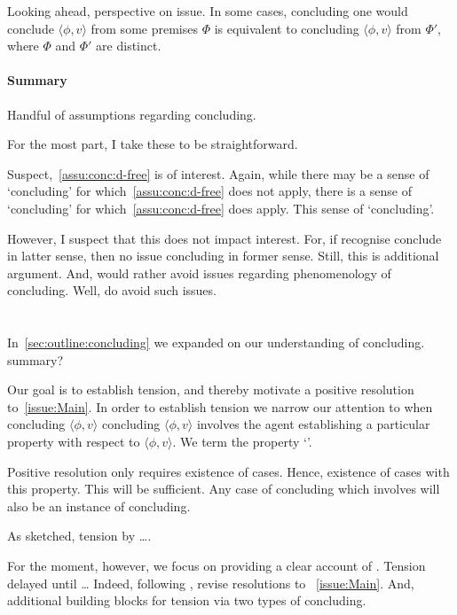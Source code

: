 \begin{note}
  Looking ahead, perspective on issue.
  In some cases, concluding one would conclude \(\langle \phi,v \rangle\) from some premises \(\Phi\) is equivalent to concluding \(\langle \phi,v \rangle\) from \(\Phi'\), where \(\Phi\) and \(\Phi'\) are distinct.
\end{note}

\paragraph{Summary}

\begin{note}[Summary]
  Handful of assumptions regarding concluding.

  For the most part, I take these to be straightforward.

  Suspect,~\autoref{assu:conc:d-free} is of interest.
  Again, while there may be a sense of `concluding' for which~\autoref{assu:conc:d-free} does not apply, there is a sense of `concluding' for which~\autoref{assu:conc:d-free} does apply.
  This sense of `concluding'.

  However, I suspect that this does not impact interest.
  For, if recognise conclude in latter sense, then no issue concluding in former sense.
  Still, this is additional argument.
  And, would rather avoid issues regarding phenomenology of concluding.
  Well, do avoid such issues.
\end{note}

\section{}
\label{sec:overview:csn2}

\begin{note}
  \begin{quote}
    \issueMain*
  \end{quote}
  In~\autoref{sec:outline:concluding} we expanded on our understanding of concluding.
  {
    \color{red} summary?
  }

  Our goal is to establish tension, and thereby motivate a positive resolution to~\autoref{issue:Main}.
  In order to establish tension we narrow our attention to when concluding \(\langle \phi,v \rangle\) concluding \(\langle \phi,v \rangle\) involves the agent establishing a particular property with respect to \(\langle \phi,v \rangle\).
  We term the property `\csN{}'.

  Positive resolution only requires existence of cases.
  Hence, existence of cases with this property.
  This will be sufficient.
  Any case of concluding which involves \csVImp{} will also be an instance of concluding.

  As sketched, tension by {\color{red} \dots}.

  For the moment, however, we focus on providing a clear account of \csN{}.
  Tension delayed until \dots
  Indeed, following \csN{}, revise resolutions to ~\autoref{issue:Main}.
  And, additional building blocks for tension via two types of concluding.
\end{note}

